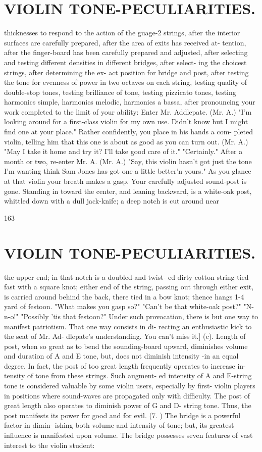 \documentclass{article}
\begin{document}
\section*{VIOLIN TONE-PECULIARITIES.}
thicknesses to respond to the action of the guage-2 strings, after the interior surfaces are carefully prepared, after the area of exits has received at- tention, after the finger-board has been carefully prepared and adjusted, after selecting and testing different densities in different bridges, after select- ing the choicest strings, after determining the ex- act position for bridge and post, after testing the tone for evenness of power in two octaves on each string, testing quality of double-stop tones, testing brilliance of tone, testing pizzicato tones, testing harmonics simple, harmonics melodic, harmonics a bassa, after pronouncing your work completed to the limit of your ability: Enter Mr. Addlepate. (Mr. A.) "I'm looking around for a first-class violin for my own use. Didn't know but I might find one at your place." Rather confidently, you place in his hands a com- pleted violin, telling him that this one is about as good as you can turn out. (Mr. A.) "May I take it home and try it? I'll take good care of it." "Certainly." After a month or two, re-enter Mr. A. (Mr. A.) "Say, this violin hasn't got just the tone I'm wanting think Sam Jones has got one a little better'n yours." As you glance at that violin your breath makes a gasp. Your carefully adjusted sound-post is gone. Standing in toward the center, and leaning backward, is a white-oak post, whittled down with a dull jack-knife; a deep notch is cut around near

163

\section*{VIOLIN TONE-PECULIARITIES.}
the upper end; in that notch is a doubled-and-twist- ed dirty cotton string tied fast with a square knot; either end of the string, passing out through either exit, is carried around behind the back, there tied in a bow knot; thence hangs 1-4 yard of festoon. "What makes you gasp so?" "Can't be that white-oak post?" "N-n-o!" "Possibly 'tis that festoon?" Under such provocation, there is but one way to manifest patriotism. That one way consists in di- recting an enthusiastic kick to the seat of Mr. Ad- dlepate's understanding. You can't miss it.] (c). Length of post, when so great as to bend the sounding-board upward, diminishes volume and duration of A and E tone, but, does not diminish intensity -in an equal degree. In fact, the post of too great length frequently operates to increase in- tensity of tone from these strings. Such augment- ed intensity of A and E-string tone is considered valuable by some violin users, especially by first- violin players in positions where sound-waves are propagated only with difficulty. The post of great length also operates to diminish power of G and D- string tone. Thus, the post manifests its power for good and for evil. (7. ) The bridge is a powerful factor in dimin- ishing both volume and intensity of tone; but, its greatest influence is manifested upon volume. The bridge possesses seven features of vast interest to the violin student:
\end{document}
